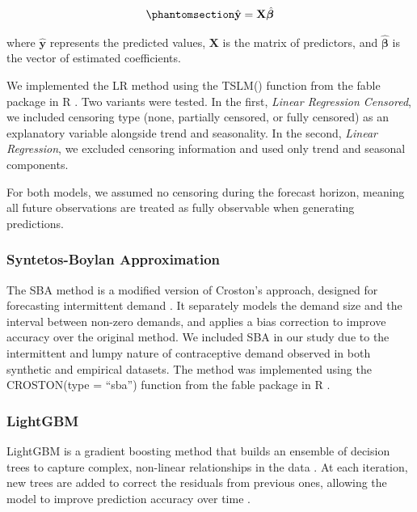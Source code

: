\documentclass[
  authoryear,
  doubleblind,
  3p]{elsarticle}
\begin{document}
\begin{equation}\phantomsection\label{eq-lr_wp2}{
\hat{\mathbf{y}} = \mathbf{X} \hat{\boldsymbol{\beta}}
}\end{equation}

where \(\hat{\mathbf{y}}\) represents the predicted values,
\(\mathbf{X}\) is the matrix of predictors, and
\(\hat{\boldsymbol{\beta}}\) is the vector of estimated coefficients.

We implemented the LR method using the TSLM() function from the fable
package in R \citep{fable2022}. Two variants were tested. In the first,
\emph{Linear Regression Censored}, we included censoring type (none,
partially censored, or fully censored) as an explanatory variable
alongside trend and seasonality. In the second, \emph{Linear
Regression}, we excluded censoring information and used only trend and
seasonal components.

For both models, we assumed no censoring during the forecast horizon,
meaning all future observations are treated as fully observable when
generating predictions.

\subsubsection{Syntetos-Boylan
Approximation}\label{syntetos-boylan-approximation}

The SBA method is a modified version of Croston's approach, designed for
forecasting intermittent demand \citep{syntetos_accuracy_2005}. It
separately models the demand size and the interval between non-zero
demands, and applies a bias correction to improve accuracy over the
original method. We included SBA in our study due to the intermittent
and lumpy nature of contraceptive demand observed in both synthetic and
empirical datasets. The method was implemented using the CROSTON(type =
``sba'') function from the fable package in R \citep{fable2022}.

\subsubsection{LightGBM}\label{lightgbm}

LightGBM is a gradient boosting method that builds an ensemble of
decision trees to capture complex, non-linear relationships in the data
. At each iteration, new trees are added to correct the residuals from
previous ones, allowing the model to improve prediction accuracy over
time \citep{januschowski2022}.
\end{document}
